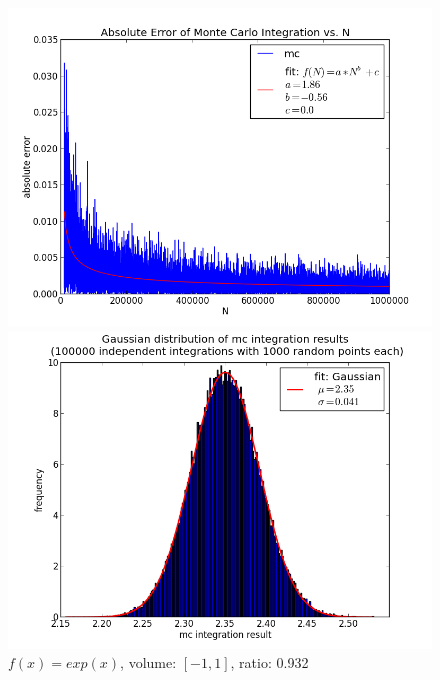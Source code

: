 \documentclass[12pt,a4paper,titlepage]{article}
\begin{document}
\begin{figure}
	\centering
	\caption{$f(x)=exp(x)$, volume: $[-1,1]$, ratio: 0.932}
	\begin{minipage}[b]{\linewidth}
		\centering
		\includegraphics[width=\linewidth]{Plots/eFunktion}
	\end{minipage}
	\begin{minipage}[b]{\linewidth}
		\centering
		\includegraphics[width=\linewidth]{Plots/eFunktionHist}
	\end{minipage}
	\label{fig:linear}
\end{figure}
\end{document}
